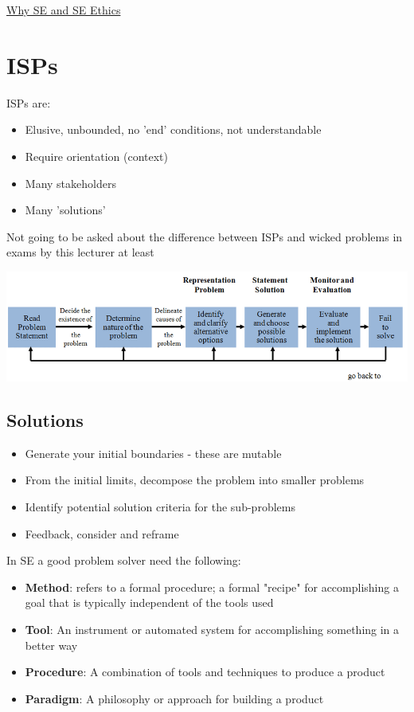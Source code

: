 \documentclass{article}[18pt]
\begin{document}
\begin{center}
\underline{\huge Why SE and SE Ethics}
\end{center}
\section{ISPs}
ISPs are:
\begin{itemize}
	\item Elusive, unbounded, no 'end' conditions, not understandable
	\item Require orientation (context)
	\item Many stakeholders
	\item Many 'solutions'
\end{itemize}
Not going to be asked about the difference between ISPs and wicked problems in exams by this lecturer at least
\begin{center}
	\includegraphics[scale=0.7]{ISP}
\end{center}
\subsection{Solutions}
\begin{itemize}
	\item Generate your initial boundaries - these are mutable
	\item From the initial limits, decompose the problem into smaller problems
	\item Identify potential solution criteria for the sub-problems
	\item Feedback, consider and reframe
\end{itemize}
In SE a good problem solver need the following:
\begin{itemize}
	\item \textbf{Method}: refers to a formal procedure; a formal "recipe" for accomplishing a goal that is typically independent of the tools used
	\item \textbf{Tool}: An instrument or automated system for accomplishing something in a better way
	\item \textbf{Procedure}: A combination of tools and techniques to produce a product
	\item \textbf{Paradigm}: A philosophy or approach for building a product
\end{itemize}
\end{document}
